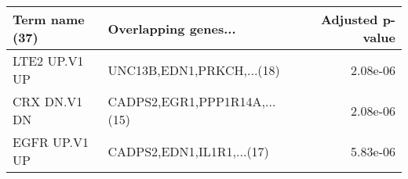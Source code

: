 \begin{tabular}{llr}
\toprule
Term name (37) &         Overlapping genes... &  Adjusted p-value \\
\midrule
 LTE2 UP.V1 UP &    UNC13B,EDN1,PRKCH,...(18) &          2.08e-06 \\
  CRX DN.V1 DN & CADPS2,EGR1,PPP1R14A,...(15) &          2.08e-06 \\
 EGFR UP.V1 UP &    CADPS2,EDN1,IL1R1,...(17) &          5.83e-06 \\
\bottomrule
\end{tabular}
